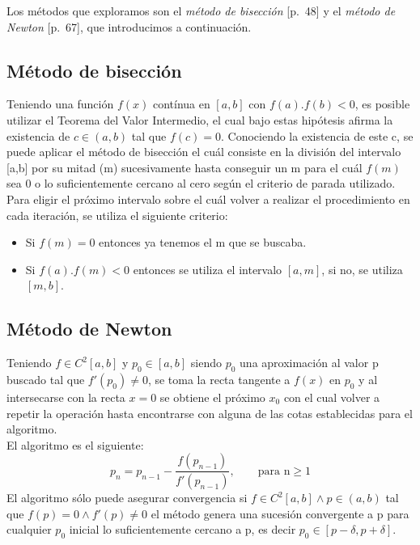 \documentclass[a4paper,10pt,twoside]{article}
\begin{document}
Los métodos que exploramos son el \emph{método de bisección} \cite{burden}[p.~48]
y el \emph{método de Newton} \cite{burden}[p.~67], que introducimos a continuación.


\subsection{Método de bisección}
Teniendo una función $f(x)$ contínua en $[a,b]$ con $f(a).f(b) < 0$, es posible utilizar el Teorema del Valor Intermedio, el cual bajo estas hipótesis afirma la existencia de $c \in (a,b)$ tal que $f(c) = 0$. Conociendo la existencia de este c, se puede aplicar el método de bisección el cuál consiste en la división del intervalo [a,b] por su mitad (m) sucesivamente hasta conseguir un m para el cuál $f(m)$ sea 0 o lo suficientemente cercano al cero según el criterio de parada utilizado.
Para eligir el próximo intervalo sobre el cuál volver a realizar el procedimiento en cada iteración, se utiliza el siguiente criterio:

\begin{itemize}
    \item Si $f(m) = 0$ entonces ya tenemos el m que se buscaba.
    \item Si $f(a).f(m) < 0$ entonces se utiliza el intervalo $[a,m]$, si no, se utiliza $[m,b]$.
\end{itemize}

\subsection{Método de Newton}
Teniendo $f \in C^2[a,b]$ y $p_0 \in [a, b]$ siendo $p_0$ una aproximación al valor p buscado tal que $f'(p_0) \neq 0$, se toma la recta tangente a $f(x)$ en $p_0$ y al intersecarse con la recta $x = 0$ se obtiene el próximo $x_0$ con el cual volver a repetir la operación hasta encontrarse con alguna de las cotas establecidas para el algoritmo. \\
El algoritmo es el siguiente: 
\begin{equation*}
	p_n = p_{n-1} - \frac{f(p_{n-1})}{f'(p_{n-1})} , \qquad \text{para n} \geq 1
\end{equation*}
El algoritmo sólo puede asegurar convergencia si $f \in C^2[a,b] \land p \in (a,b)$ tal que $f(p) = 0 \land f'(p) \neq 0$ el método genera una sucesión convergente a p para cualquier $p_0$ inicial lo suficientemente cercano a p, es decir $p_0 \in [p-\delta,p+\delta]$.


\end{document}
